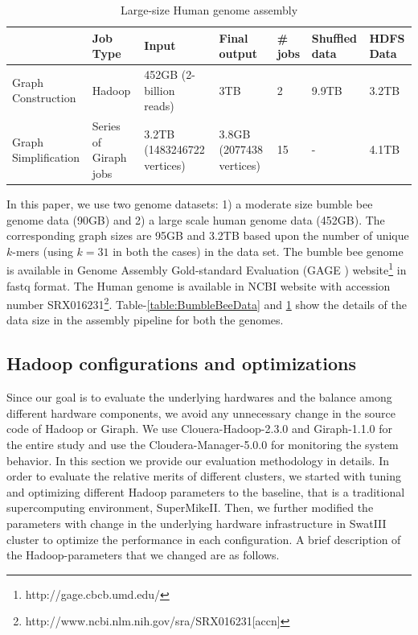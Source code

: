 \documentclass[conference]{IEEEtran}
\begin{document}
\begin{table}
\begin{center}
    \begin{tabular}{ |p{1.1cm} | p{0.8cm} | p{1.1cm} | p{0.8cm} | p{0.8cm} | p{0.8cm} | p{0.8cm}|} \hline
    & Job Type & Input & Final output & \# jobs & Shuffled data & HDFS Data \\ \hline
    Graph Construction & Hadoop & 452GB (2-billion reads) & 3TB & 2 & 9.9TB & 3.2TB \\ \hline
    Graph Simplification & Series of Giraph jobs & 3.2TB (1483246722 vertices) & 3.8GB (2077438 vertices) & 15 & - & 4.1TB \\ \hline    
    \end{tabular}
    \caption{Large-size Human genome assembly}
	\label{table:HumanData}
\end{center}
\vspace{-2.3em}
\end{table}
In this paper, we use two genome datasets: 1) a moderate size bumble bee genome data (90GB) and 2) a large scale human genome data (452GB). 
The corresponding graph sizes are 95GB and 3.2TB based upon the number of unique $k$-mers (using $k=31$ in both the cases) in the data set. 
The bumble bee genome is available in Genome Assembly Gold-standard Evaluation (GAGE \cite{bio:gage}) website\footnote{http://gage.cbcb.umd.edu/} in fastq format. 
The Human genome is available in NCBI website with accession number SRX016231\footnote{http://www.ncbi.nlm.nih.gov/sra/SRX016231[accn]}. 
Table-\ref{table:BumbleBeeData} and \ref{table:HumanData} show the details of the data size in the assembly pipeline for both the genomes. 

\subsection {Hadoop configurations and optimizations} \label{HadoopConfigurationsAndoptimizations}
Since our goal is to evaluate the underlying hardwares and the balance among different hardware components, we avoid any unnecessary change in the source code of Hadoop or Giraph. 
We use Clouera-Hadoop-2.3.0 and Giraph-1.1.0 for the entire study and use the Cloudera-Manager-5.0.0 for monitoring the system behavior. In this section we provide our evaluation methodology in details. 
In order to evaluate the relative merits of different clusters, we started with tuning and optimizing different Hadoop parameters to the baseline, that is a traditional supercomputing environment, SuperMikeII. Then, we further modified the parameters with change in the underlying hardware infrastructure in SwatIII cluster to optimize the performance in each configuration.
A brief description of the Hadoop-parameters that we changed are as follows.
  
\end{document}
